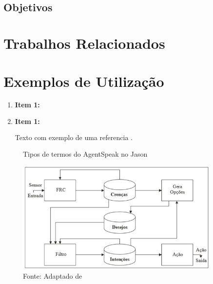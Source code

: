 \documentclass{utfpr-pg}
\begin{document}
  \section{Objetivos}


\chapter{Trabalhos Relacionados}
  \label{chaper:trabrel}
  \blindtext[4]

\chapter{Exemplos de Utilização}
  \label{chapter:exemplos}
  \blindtext

  \begin{enumerate}
    \item \textbf{Item 1:} \blindtext
    \item \textbf{Item 1:} \blindtext

    Texto com exemplo de uma referencia \cite{Bordini:2007:PMS:1197104}.
\end{enumerate}

  \begin{figure}[h!]
      \centering
      \captionsetup{width=0.9\textwidth}
      \caption{Tipos de termos do AgentSpeak no Jason}
      \includegraphics[width=0.9\textwidth]{images/bdiGenerica.jpg}
      \caption*{Fonte: Adaptado de \cite{Bordini:2007:PMS:1197104}}
   	  \label{fig:typesAgent}
    \end{figure}

\blindtext
\end{document}
